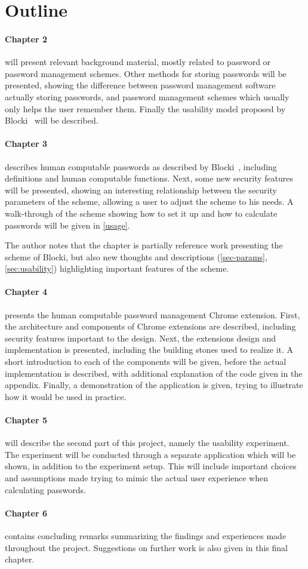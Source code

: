 \section{Outline}
\paragraph{Chapter 2} will present relevant background material, mostly related to password or password management schemes. Other methods for storing passwords will be presented, showing the difference between password management software actually storing passwords, and password management schemes which usually only helps the user remember them. Finally the usability model proposed by Blocki~\cite{Blocki2014} will be described.
\paragraph{Chapter 3} describes human computable passwords as described by Blocki~\cite{hcp-blocki}, including definitions and human computable functions. Next, some new security features will be presented, showing an interesting relationship between the security parameters of the scheme, allowing a user to adjust the scheme to his needs. A walk-through of the scheme showing how to set it up and how to calculate passwords will be given in \autoref{usage}.
\par The author notes that the chapter is partially reference work presenting the scheme of Blocki, but also new thoughts and descriptions (\autoref{sec-params}, \autoref{sec:usability}) highlighting important features of the scheme. 
\paragraph{Chapter 4} presents the human computable password management Chrome extension. First, the architecture and components of Chrome extensions are described, including security features important to the design. Next, the extensions design and implementation is presented, including the building stones used to realize it. A short introduction to each of the components will be given, before the actual implementation is described, with additional explanation of the code given in the appendix. Finally, a demonstration of the application is given, trying to illustrate how it would be used in practice. 
\paragraph{Chapter 5} will describe the second part of this project, namely the usability experiment. The experiment will be conducted through a separate application which will be shown, in addition to the experiment setup. This will include important choices and assumptions made trying to mimic the actual user experience when calculating passwords.
\paragraph{Chapter 6} contains concluding remarks summarizing the findings and experiences made throughout the project. Suggestions on further work is also given in this final chapter.


